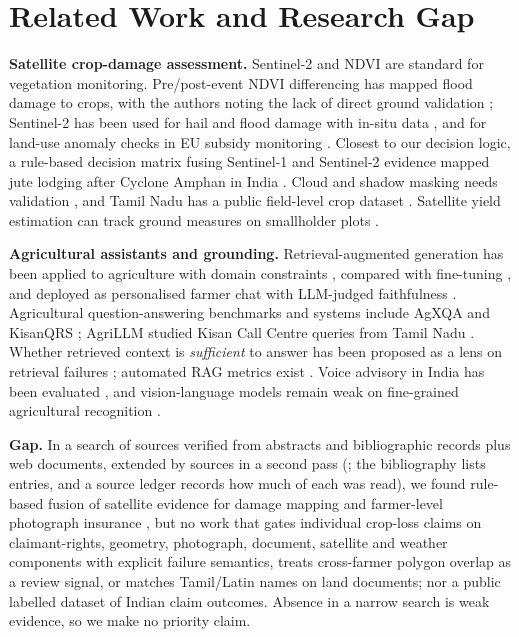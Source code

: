 \documentclass[journal]{IEEEtran}
\begin{document}
\section{Related Work and Research Gap}\label{sec:gap}
\textbf{Satellite crop-damage assessment.} Sentinel-2 \cite{drusch2012} and NDVI \cite{tucker1979} are standard for vegetation monitoring. Pre/post-event NDVI differencing has mapped flood damage to crops, with the authors noting the lack of direct ground validation \cite{ursu2025}; Sentinel-2 has been used for hail \cite{ha2022} and flood damage with in-situ data \cite{bocchino2025}, and for land-use anomaly checks in EU subsidy monitoring \cite{kanjir2018}. Closest to our decision logic, a rule-based decision matrix fusing Sentinel-1 and Sentinel-2 evidence mapped jute lodging after Cyclone Amphan in India \cite{chakraborty2021}. Cloud and shadow masking needs validation \cite{baetens2019,raiyani2021,aybar2022}, and Tamil Nadu has a public field-level crop dataset \cite{sani2024}. Satellite yield estimation can track ground measures on smallholder plots \cite{lobell2020,burke2017}.

\textbf{Agricultural assistants and grounding.} Retrieval-augmented generation \cite{lewis2020,gao2023} has been applied to agriculture with domain constraints \cite{ravindran2026}, compared with fine-tuning \cite{balaguer2024}, and deployed as personalised farmer chat with LLM-judged faithfulness \cite{singh2024}. Agricultural question-answering benchmarks and systems include AgXQA \cite{kpodo2024} and KisanQRS \cite{rehman2023}; AgriLLM studied Kisan Call Centre queries from Tamil Nadu \cite{didwania2024}. Whether retrieved context is \emph{sufficient} to answer has been proposed as a lens on retrieval failures \cite{joren2025}; automated RAG metrics exist \cite{es2024}. Voice advisory in India has been evaluated \cite{cole2021}, and vision-language models remain weak on fine-grained agricultural recognition \cite{shinoda2025}.

\textbf{Gap.} In a search of \GapFirstPassVerified{} sources verified from abstracts and bibliographic records plus \GapFirstPassWeb{} web documents, extended by \GapSecondPassAdded{} sources in a second pass (\LiteratureSearchDate{}; the bibliography lists \BibEntries{} entries, and a source ledger records how much of each was read), we found rule-based fusion of satellite evidence for damage mapping \cite{chakraborty2021} and farmer-level photograph insurance \cite{ceballos2019}, but no work that gates individual crop-loss claims on claimant-rights, geometry, photograph, document, satellite and weather components with explicit failure semantics, treats cross-farmer polygon overlap as a review signal, or matches Tamil/Latin names on land documents; nor a public labelled dataset of Indian claim outcomes. Absence in a narrow search is weak evidence, so we make no priority claim.
\end{document}
